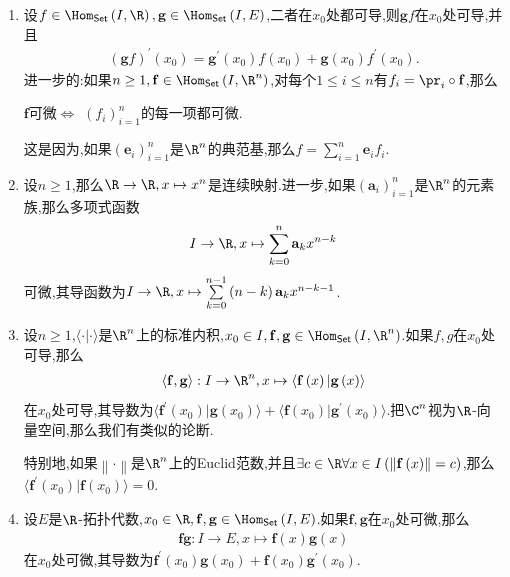\begin{example}{}{}
	\begin{enumerate}
		\item 设$f\in\Hom_{\mathsf{Set}}\left(I,\R\right),\mathbf{g}\in\Hom_{\mathsf{Set}}\left(I,E\right)$,二者在$x_{0}$处都可导,则$\mathbf{g}f$在$x_{0}$处可导,并且
		\begin{align*}
			\left(\mathbf{g}f\right)^{\prime}\left(x_{0}\right)=\mathbf{g}^{\prime}\left(x_{0}\right)f\left(x_{0}\right)+\mathbf{g}\left(x_{0}\right)f^{\prime}\left(x_{0}\right).
		\end{align*}
		进一步的:如果$n\geq 1,\mathbf{f}\in\Hom_{\mathsf{Set}}\left(I,\R^{n}\right)$,对每个$1\leq i\leq n$有$f_{i}=\pr_{i}\circ\mathbf{f}$,那么
		\begin{center}
			$\mathbf{f}$可微$\iff$ $\left(f_{i}\right)_{i=1}^{n}$的每一项都可微.
		\end{center}
		这是因为,如果$\left(\mathbf{e}_{i}\right)_{i=1}^{n}$是$\R^{n}$的典范基,那么$f=\sum\limits_{i=1}^{n}\mathbf{e}_{i}f_{i}$.
		\item 设$n\geq 1$,那么$\R\to\R,x\mapsto x^{n}$是连续映射.进一步,如果$\left(\mathbf{a}_{i}\right)_{i=1}^{n}$是$\R^{n}$的元素族,那么多项式函数
		\begin{align*}
			I\to\R,x\mapsto\sum\limits_{k=0}^{n}\mathbf{a}_{k}x^{n-k}
		\end{align*}
		可微,其导函数为$I\to\R,x\mapsto\sum\limits_{k=0}^{n-1}\left(n-k\right)\mathbf{a}_{k}x^{n-k-1}$.
		\item 设$n\geq 1$,$\langle\cdot|\cdot\rangle$是$\R^{n}$上的标准内积,$x_{0}\in I,\mathbf{f},\mathbf{g}\in\Hom_{\mathsf{Set}}\left(I,\R^{n}\right)$.如果$f,g$在$x_{0}$处可导,那么
		\begin{align*}
			\langle\mathbf{f},\mathbf{g}\rangle:I\to\R^{n},x\mapsto\langle \mathbf{f}\left(x\right)|\mathbf{g}\left(x\right)\rangle
		\end{align*}
		在$x_{0}$处可导,其导数为$\langle \mathbf{f}^{\prime}\left(x_{0}\right)|\mathbf{g}\left(x_{0}\right)\rangle+\langle\mathbf{f}\left(x_{0}\right)|\mathbf{g}^{\prime}\left(x_{0}\right)\rangle$.把$\C^{n}$视为$\R$-向量空间,那么我们有类似的论断.
		
		
		特别地,如果$\left\|\cdot\right\|$是$\R^{n}$上的Euclid范数,并且$\exists c\in\R\forall x\in I\left(\left\|\mathbf{f}\left(x\right)\right\|=c\right)$,那么$\langle\mathbf{f}^{\prime}\left(x_{0}\right)|\mathbf{f}\left(x_{0}\right)\rangle=0$.
		\item 设$E$是$\R$-拓扑代数,$x_{0}\in\R,\mathbf{f},\mathbf{g}\in\Hom_{\mathsf{Set}}\left(I,E\right)$.如果$\mathbf{f},\mathbf{g}$在$x_{0}$处可微,那么
		\begin{align*}
			\mathbf{f}\mathbf{g}:I\to E,x\mapsto \mathbf{f}\left(x\right)\mathbf{g}\left(x\right)
		\end{align*}
		在$x_{0}$处可微,其导数为$\mathbf{f}^{\prime}\left(x_{0}\right)\mathbf{g}\left(x_{0}\right)+\mathbf{f}\left(x_{0}\right)\mathbf{g}^{\prime}\left(x_{0}\right)$.
		

\end{enumerate}
\end{example}
